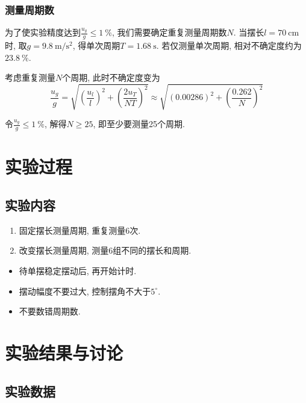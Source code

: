 \documentclass[9pt,a4paper,twoside]{../rho-class/rho}
\begin{document}
\subsubsection{测量周期数}

为了使实验精度达到$\frac{u_g}{g} \leqslant \qty{1}{\percent}$, 我们需要确定重复测量周期数$N$.
当摆长$l = \qty{70}{\centi\metre}$时, 取$g = \qty{9.8}{\metre\per\second\squared}$, 得单次周期$T = \qty{1.68}{\second}$.
若仅测量单次周期, 相对不确定度约为$\qty{23.8}{\percent}$.

考虑重复测量$N$个周期, 此时不确定度变为
\begin{equation}
    \frac{u_g}{g} = \sqrt{\left( \frac{u_l}{l} \right)^2 + \left( \frac{2u_T}{NT} \right)^2} \approx \sqrt{\left( 0.00286 \right)^2 + \left( \frac{0.262}{N} \right)^2}
\end{equation}

令$\frac{u_g}{g} \leqslant \qty{1}{\percent}$, 解得$N \geqslant 25$, 即至少要测量25个周期.

\section{实验过程}
\subsection{实验内容}

\begin{enumerate}
    \item 固定摆长测量周期, 重复测量6次.
    \item 改变摆长测量周期, 测量6组不同的摆长和周期.
\end{enumerate}

\begin{rhoenv}[frametitle=Attention.]
    \begin{itemize}
        \item 待单摆稳定摆动后, 再开始计时.
        \item 摆动幅度不要过大, 控制摆角不大于$5^{\circ}$.
        \item 不要数错周期数.
    \end{itemize}
\end{rhoenv}

\section{实验结果与讨论}

\subsection{实验数据}
\end{document}
